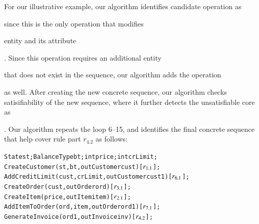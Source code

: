 For our illustrative example, our algorithm identifies candidate operation as \subject{AddItemToOrder}
since this is the only operation that modifies \subject{Order} entity and its attribute \subject{total}.
Since this operation requires an additional entity \subject{Item} that does not exist
in the sequence, our algorithm adds the operation \subject{CreateItem} as well. After creating
the new concrete sequence, our algorithm checks satisifiability of the new sequence,
where it further detects the unsatisfiable core as \subject{cust.crLimit = 0 $\wedge$ cust.crLimit > 0}. 
Our algorithm repeats the loop 6--15, and identifies the final concrete sequence that help cover rule part $r_{4.2}$ as
follows:

\vspace*{-5pt}
{\small
\begin{alltt}
  State st; BalanceType bt; int price; int crLimit;
  CreateCustomer(st, bt, out Customer cust) [\(r\sb{1.1}\)];
  AddCreditLimit(cust, crLimit, out Customer cust1) [\(r\sb{6.1}\)];
  CreateOrder(cust, out Order ord) [\(r\sb{3.1}\)];
  CreateItem(price, out Item item) [\(r\sb{2.1}\)];
  AddItemToOrder(ord, item, out Order ord1) [\(r\sb{7.1}\)];
  GenerateInvoice(ord1, out Invoice inv) [\(r\sb{4.2}\)];  
\end{alltt}
}
\vspace*{-5pt}

